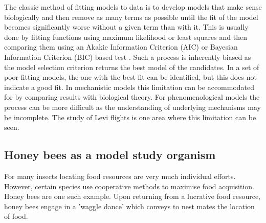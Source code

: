 \documentclass[11pt,usenames,dvipsnames]{article}
\begin{document}
The classic method of fitting models to data is to develop models that make sense biologically and then remove as many terms as possible until the fit of the model becomes significantly worse without a given term than with it. This is usually done by fitting functions using maximum likelihood or least squares and then comparing them using an Akakie Information Criterion (AIC) or Bayesian Information Criterion (BIC) based test \cite{Burnham2004}. Such a process is inherently biased as the model selection criterion returns the best model of the candidates. In a set of poor fitting models, the one with the best fit can be identified, but this does not indicate a good fit. In mechanistic models this limitation can be accommodated for by comparing results with biological theory. For phenomenological models the process can be more difficult as the understanding of underlying mechanisms may be incomplete. The study of Levi flights is one area where this limitation can be seen. 


\subsection{Honey bees as a model study organism}
For many insects locating food resources are very much individual efforts. However, certain species use cooperative methods to maximise food acquisition. Honey bees are one such example. Upon returning from a lucrative food resource, honey bees engage in a 'waggle dance' which conveys to nest mates the location of food.   




\end{document}
